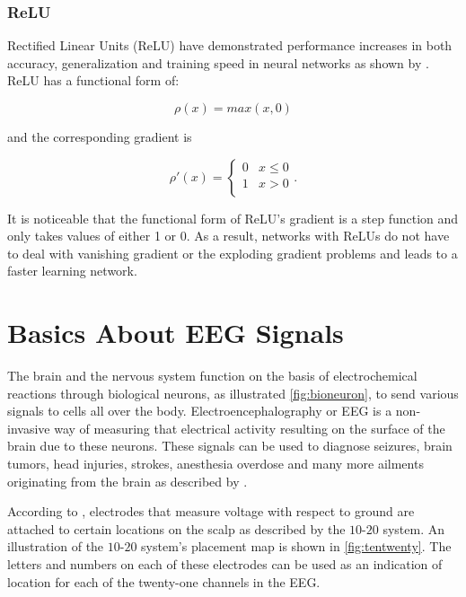 \subsubsection*{ReLU}

Rectified Linear Units (ReLU) have demonstrated performance increases in both accuracy, generalization and training speed in neural networks as shown by \citet{dahl2013improving}. ReLU has a functional form of:

\begin{equation}
	\rho(x) = max(x, 0)
\end{equation}

\noindent
and the corresponding gradient is 

\begin{equation}
	\rho'(x) =  \begin{cases} 
		
	0 & x \leq 0 \\
	1 & x > 0 \\
	\end{cases}.
\end{equation}

\noindent It is noticeable that the functional form of ReLU's gradient is a step function and only takes values of either 1 or 0. As a result, networks with ReLUs do not have to deal with vanishing gradient or the exploding gradient problems and leads to a faster learning network.

\section{Basics About EEG Signals}

The brain and the nervous system function on the basis of electrochemical reactions through biological neurons, as illustrated \cref{fig:bioneuron}, to send various signals to cells all over the body. Electroencephalography or EEG is a non-invasive way of measuring that electrical activity resulting on the surface of the brain due to these neurons. These signals can be used to diagnose seizures, brain tumors, head injuries, strokes, anesthesia overdose and many more ailments originating from the brain as described by \citet{mayo_eegs}.

According to \citet{eegs_info}, electrodes that measure voltage with respect to ground are attached to certain locations on the scalp as described by the $10$-$20$ system. An illustration of the $10$-$20$ system's placement map is shown in \cref{fig:tentwenty}. The letters and numbers on each of these electrodes can be used as an indication of location for each of the twenty-one channels in the EEG. 

